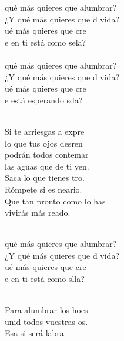 \begin{cancion}%
	\begin{chorus}%
	 qué más quieres que alumbrar?\\
	¿Y qué más quieres que d vida?\\
	ué más quieres que cre \\
	e en ti está como sela?\\
\jump\\
	 qué más quieres que alumbrar?\\
	¿Y qué más quieres que d vida?\\
	ué más quieres que cre \\
	e está esperando sda?\\
	\end{chorus}%
	\jump\\
	Si te arriesgas a expre \\
	lo que tus ojos desren\\
	podrán todos contemar\\
	las aguas que de ti yen.\\
	Saca lo que tienes tro. \\
	Rómpete si es neario.\\
	Que tan pronto como lo has \\
	vivirás más reado.\\\jump\\
	\begin{chorus}%
	 qué más quieres que alumbrar?\\
	¿Y qué más quieres que d vida?\\
	ué más quieres que cre \\
	e en ti está como slla?\\
	\end{chorus}%
	\jump\\
	Para alumbrar los hoes \\
	unid todos vuestras os.\\
	Esa si será labra\\

\end{cancion}
